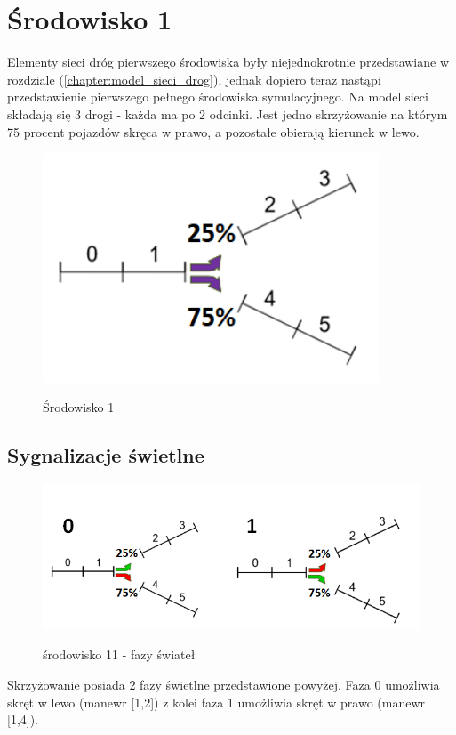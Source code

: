 \documentclass[12pt]{book}
\theoremstyle{plain}
\newcommand{\myref}[1]{(\ref{#1})}
\begin{document}
\section{Środowisko 1}
Elementy sieci dróg pierwszego środowiska były niejednokrotnie przedstawiane w rozdziale \myref{chapter:model_sieci_drog}, jednak dopiero teraz nastąpi przedstawienie pierwszego pełnego środowiska symulacyjnego. Na model sieci składają się 3 drogi - każda ma po 2 odcinki. Jest jedno skrzyżowanie na którym 75 procent pojazdów skręca w prawo, a pozostałe obierają kierunek w lewo.
\begin{figure}[H]
	\centering
	\includegraphics[width=10cm]{images/env_11_procenty}
	\label{fig:env_11}
	\caption{Środowisko 1}
\end{figure}

\subsection{Sygnalizacje świetlne}	
\begin{figure}[H]
	\centering
	\includegraphics[width=17cm]{images/env_11_fazy_procenty_no_yellow}
	\label{fig:env_11_fazy}
	\caption{środowisko 11 - fazy świateł}
\end{figure}\noindent
Skrzyżowanie posiada 2 fazy świetlne przedstawione powyżej. Faza 0 umożliwia skręt w lewo (manewr [1,2]) z kolei faza 1 umożliwia skręt w prawo (manewr [1,4]).
\end{document}
